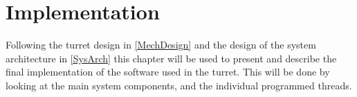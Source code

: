 \chapter{Implementation}
Following the turret design in \autoref{MechDesign} and the design of the system
architecture in \autoref{SysArch} this chapter will be used to present and
describe the final implementation of the software used in the \name turret. This will be done
by looking at the main system components, and the individual programmed threads.


 
